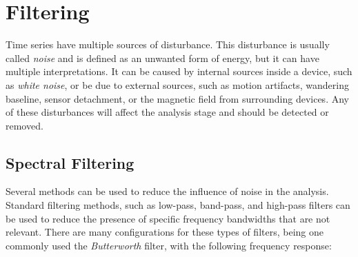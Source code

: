 %
%

\section{Filtering}
\label{sec:filt}

Time series have multiple sources of disturbance. This disturbance is usually called \textit{noise} and is defined as an unwanted form of energy, but it can have multiple interpretations. It can be caused by internal sources inside a device, such as \textit{white noise}, or be due to external sources, such as motion artifacts, wandering baseline, sensor detachment, or the magnetic field from surrounding devices. Any of these disturbances will affect the analysis stage and should be detected or removed.

\subsection{Spectral Filtering}
\label{subsec:spec_filt}

Several methods can be used to reduce the influence of noise in the analysis. Standard filtering methods, such as low-pass, band-pass, and high-pass filters can be used to reduce the presence of specific frequency bandwidths that are not relevant. There are many configurations for these types of filters, being one commonly used the \textit{Butterworth} filter, with the following frequency response:

